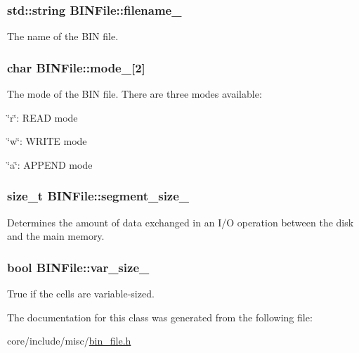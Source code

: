 \subsubsection[{filename\+\_\+}]{\setlength{\rightskip}{0pt plus 5cm}std\+::string B\+I\+N\+File\+::filename\+\_\+\hspace{0.3cm}{\ttfamily [private]}}\label{classBINFile_abcaf9d032fcac353059a72244120e9fa}
The name of the B\+I\+N file. \hypertarget{classBINFile_a7f7e6a137b016f6cd533515076982faa}{}
\subsubsection[{mode\+\_\+}]{\setlength{\rightskip}{0pt plus 5cm}char B\+I\+N\+File\+::mode\+\_\+\mbox{[}2\mbox{]}\hspace{0.3cm}{\ttfamily [private]}}\label{classBINFile_a7f7e6a137b016f6cd533515076982faa}
The mode of the B\+I\+N file. There are three modes available\+:

\char`\"{}r\char`\"{}\+: R\+E\+A\+D mode

\char`\"{}w\char`\"{}\+: W\+R\+I\+T\+E mode

\char`\"{}a\char`\"{}\+: A\+P\+P\+E\+N\+D mode \hypertarget{classBINFile_a55f579b9027292fa6f56cb7f0e90f922}{}
\subsubsection[{segment\+\_\+size\+\_\+}]{\setlength{\rightskip}{0pt plus 5cm}size\+\_\+t B\+I\+N\+File\+::segment\+\_\+size\+\_\+\hspace{0.3cm}{\ttfamily [private]}}\label{classBINFile_a55f579b9027292fa6f56cb7f0e90f922}
Determines the amount of data exchanged in an I/\+O operation between the disk and the main memory. \hypertarget{classBINFile_af6d2bb5c8844e38d6631905fd662e8d8}{}
\subsubsection[{var\+\_\+size\+\_\+}]{\setlength{\rightskip}{0pt plus 5cm}bool B\+I\+N\+File\+::var\+\_\+size\+\_\+\hspace{0.3cm}{\ttfamily [private]}}\label{classBINFile_af6d2bb5c8844e38d6631905fd662e8d8}
True if the cells are variable-\/sized. 

The documentation for this class was generated from the following file\+:\begin{DoxyCompactItemize}
\item 
core/include/misc/\hyperlink{bin__file_8h}{bin\+\_\+file.\+h}\end{DoxyCompactItemize}
